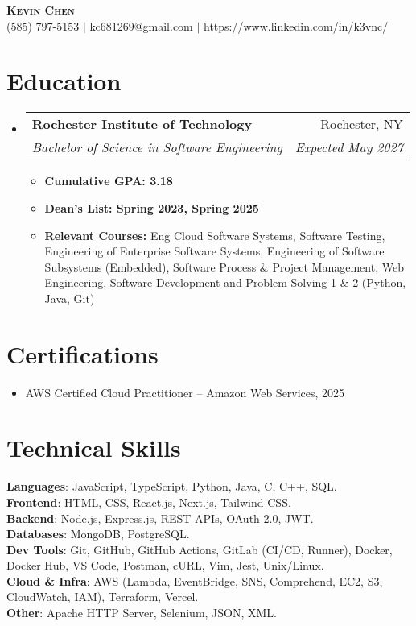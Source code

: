 \documentclass[letterpaper,11pt]{article}
\makeatletter
\newcommand{\resumeItem}[1]{
  \item\small{
    {#1 \vspace{-2pt}}
  }
}
\newcommand{\resumeSubheading}[4]{
  \vspace{-2pt}\item
    \begin{tabular*}{0.97\textwidth}[t]{l@{\extracolsep{\fill}}r}
      \textbf{#1} & #2 \\
      \textit{\small#3} & \textit{\small #4} \\
    \end{tabular*}\vspace{-7pt}
}
\newcommand{\resumeSubHeadingListStart}{\begin{itemize}[leftmargin=0.15in, label={}]}
\newcommand{\resumeSubHeadingListEnd}{\end{itemize}}
\newcommand{\resumeItemListStart}{\begin{itemize}}
\newcommand{\resumeItemListEnd}{\end{itemize}\vspace{-5pt}}
\makeatother
\begin{document}
\begin{center}
    \textbf{\Huge \scshape Kevin Chen} \\ \vspace{1pt}
    \small (585) 797-5153 $|$ kc681269@gmail.com $|$ 
    https://www.linkedin.com/in/k3vnc/ 
\end{center}

\section{Education}
  \resumeSubHeadingListStart
    \resumeSubheading
      {Rochester Institute of Technology}{Rochester, NY}
      {Bachelor of Science in Software Engineering}{Expected May 2027}
      \resumeItemListStart
        \resumeItem{\textbf{Cumulative GPA: 3.18}}
        \resumeItem{\textbf{Dean's List: Spring 2023, Spring 2025}}
        \resumeItem{\textbf{Relevant Courses:} Eng Cloud Software Systems, Software Testing, Engineering of Enterprise Software Systems, Engineering of Software Subsystems (Embedded), Software Process \& Project Management, Web Engineering, Software Development and Problem Solving 1 \& 2 (Python, Java, Git)}
      \resumeItemListEnd
  \resumeSubHeadingListEnd

\section{Certifications}
  \resumeSubHeadingListStart
    \resumeItem{AWS Certified Cloud Practitioner -- Amazon Web Services, 2025}
  \resumeSubHeadingListEnd

\section{Technical Skills}
\begin{itemize}[leftmargin=0.15in, label={}]
\small{\item{
\textbf{Languages}{: JavaScript, TypeScript, Python, Java, C, C++, SQL.} \\
\textbf{Frontend}{: HTML, CSS, React.js, Next.js, Tailwind CSS.} \\
\textbf{Backend}{: Node.js, Express.js, REST APIs, OAuth 2.0, JWT.} \\
\textbf{Databases}{: MongoDB, PostgreSQL.} \\
\textbf{Dev Tools}{: Git, GitHub, GitHub Actions, GitLab (CI/CD, Runner), Docker, Docker Hub, VS Code, Postman, cURL, Vim, Jest, Unix/Linux.} \\
\textbf{Cloud \& Infra}{: AWS (Lambda, EventBridge, SNS, Comprehend, EC2, S3, CloudWatch, IAM), Terraform, Vercel.} \\
\textbf{Other}{: Apache HTTP Server, Selenium, JSON, XML.}}}
\end{itemize}
\end{document}
